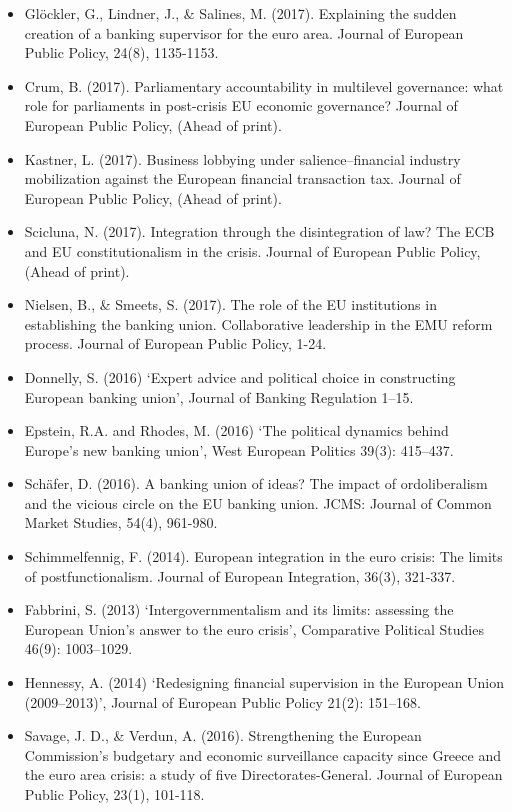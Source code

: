 \begin{itemize}
	\item Gl{\"o}ckler, G., Lindner, J., \& Salines, M. (2017). Explaining the sudden creation of a banking supervisor for the euro area. Journal of European Public Policy, 24(8), 1135-1153.
	\item Crum, B. (2017). Parliamentary accountability in multilevel governance: what role for parliaments in post-crisis EU economic governance? Journal of European Public Policy, (Ahead of print).
	\item Kastner, L. (2017). Business lobbying under salience–financial industry mobilization against the European financial transaction tax. Journal of European Public Policy, (Ahead of print).
	\item Scicluna, N. (2017). Integration through the disintegration of law? The ECB and EU constitutionalism in the crisis. Journal of European Public Policy, (Ahead of print).
	\item Nielsen, B., \& Smeets, S. (2017). The role of the EU institutions in establishing the banking union. Collaborative leadership in the EMU reform process. Journal of European Public Policy, 1-24.
	\item Donnelly, S. (2016) ‘Expert advice and political choice in constructing European banking union’, Journal of Banking Regulation 1–15.
	\item Epstein, R.A. and Rhodes, M. (2016) ‘The political dynamics behind Europe's new banking union’, West European Politics 39(3): 415–437.
	\item Sch{\"a}fer, D. (2016). A banking union of ideas? The impact of ordoliberalism and the vicious circle on the EU banking union. JCMS: Journal of Common Market Studies, 54(4), 961-980.
	\item Schimmelfennig, F. (2014). European integration in the euro crisis: The limits of postfunctionalism. Journal of European Integration, 36(3), 321-337.
	\item Fabbrini, S. (2013) ‘Intergovernmentalism and its limits: assessing the European Union's answer to the euro crisis’, Comparative Political Studies 46(9): 1003–1029. 
	\item Hennessy, A. (2014) ‘Redesigning financial supervision in the European Union (2009–2013)’, Journal of European Public Policy 21(2): 151–168.
	\item Savage, J. D., \& Verdun, A. (2016). Strengthening the European Commission's budgetary and economic surveillance capacity since Greece and the euro area crisis: a study of five Directorates-General. Journal of European Public Policy, 23(1), 101-118.

\end{itemize}
